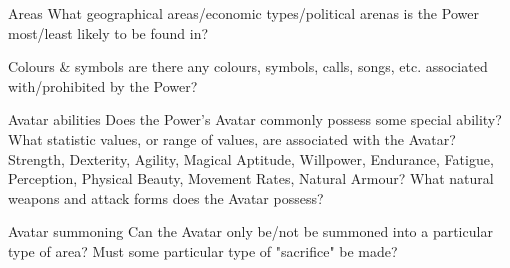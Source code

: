 \begin{Description}
\item[Areas] What geographical areas/economic types/political arenas is the Power most/least likely to be found in?
\item[Colours \& symbols] are there any colours, symbols, calls, songs, etc. associated with/prohibited by the Power?
\item[Avatar abilities] Does the Power's Avatar commonly possess some special ability?  What statistic values, or range of values, are associated with the Avatar? Strength, Dexterity, Agility, Magical Aptitude, Willpower, Endurance, Fatigue, Perception, Physical Beauty, Movement Rates, Natural Armour? What natural weapons and attack forms does the Avatar possess?
\item[Avatar summoning] Can the Avatar only be/not be summoned into a particular type of area?  Must some particular type of "sacrifice" be made?
\end{Description}

